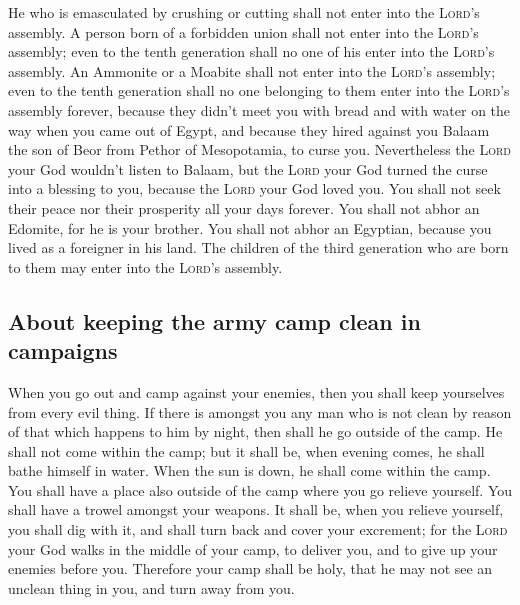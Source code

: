  He who is emasculated by crushing or cutting shall not
enter into the \textsc{Lord}'s assembly.  A person born of
a forbidden union shall not enter into the \textsc{Lord}'s assembly;
even to the tenth generation shall no one of his enter into the
\textsc{Lord}'s assembly.  An Ammonite or a Moabite shall
not enter into the \textsc{Lord}'s assembly; even to the tenth
generation shall no one belonging to them enter into the \textsc{Lord}'s
assembly forever,  because they didn't meet you with bread
and with water on the way when you came out of Egypt, and because they
hired against you Balaam the son of Beor from Pethor of Mesopotamia, to
curse you.  Nevertheless the \textsc{Lord} your God
wouldn't listen to Balaam, but the \textsc{Lord} your God turned the
curse into a blessing to you, because the \textsc{Lord} your God loved
you.  You shall not seek their peace nor their prosperity
all your days forever.  You shall not abhor an Edomite,
for he is your brother. You shall not abhor an Egyptian, because you
lived as a foreigner in his land.  The children of the
third generation who are born to them may enter into the \textsc{Lord}'s
assembly.

\hypertarget{about-keeping-the-army-camp-clean-in-campaigns}{%
\subsection{About keeping the army camp clean in
campaigns}\label{about-keeping-the-army-camp-clean-in-campaigns}}

 When you go out and camp against your enemies, then you
shall keep yourselves from every evil thing.  If there is
amongst you any man who is not clean by reason of that which happens to
him by night, then shall he go outside of the camp. He shall not come
within the camp;  but it shall be, when evening comes, he
shall bathe himself in water. When the sun is down, he shall come within
the camp.  You shall have a place also outside of the
camp where you go relieve yourself.  You shall have a
trowel amongst your weapons. It shall be, when you relieve yourself, you
shall dig with it, and shall turn back and cover your excrement;
 for the \textsc{Lord} your God walks in the middle of
your camp, to deliver you, and to give up your enemies before you.
Therefore your camp shall be holy, that he may not see an unclean thing
in you, and turn away from you.

